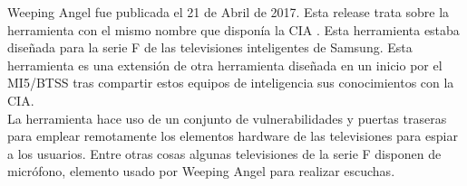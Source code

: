 Weeping Angel fue publicada el 21 de Abril de 2017. Esta release trata sobre la herramienta con el mismo nombre que disponía la CIA \cite{weeping-angel}. Esta herramienta estaba diseñada para la serie F de las televisiones inteligentes de Samsung. Esta herramienta es una extensión de otra herramienta diseñada en un inicio por el MI5/BTSS tras compartir estos equipos de inteligencia sus conocimientos con la CIA.\\
La herramienta hace uso de un conjunto de vulnerabilidades y puertas traseras para emplear remotamente los elementos hardware de las televisiones para espiar a los usuarios. Entre otras cosas algunas televisiones de la serie F disponen de micrófono, elemento usado por Weeping Angel para realizar escuchas.